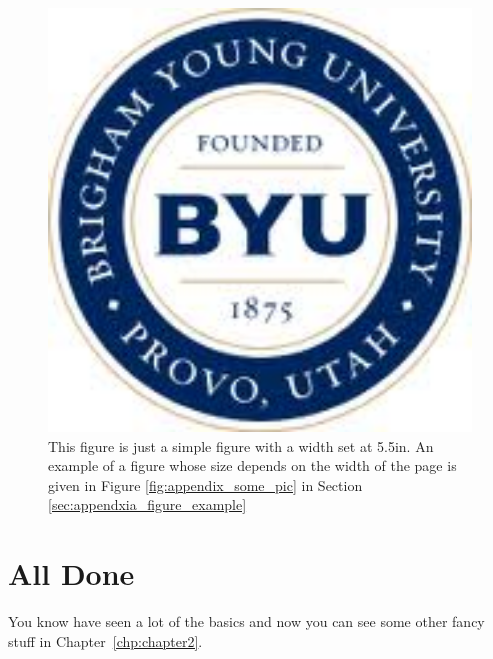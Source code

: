 \begin{figure}[hhhhhtb]
  \centering
  \includegraphics[width=5.5in]{figures/intro/stuff}
  \caption[Example Fixed Width Figure]{
This figure is just a simple figure with a width set at 5.5in. An example of a
figure whose size depends on the width of the page is given in
Figure \ref{fig:appendix_some_pic} in Section \ref{sec:appendxia_figure_example}}
%
  \label{fig:intro_stuff}
\end{figure}

\section{All Done}
You know have seen a lot of the basics and now you can see some
other fancy stuff in Chapter~\ref{chp:chapter2}.
